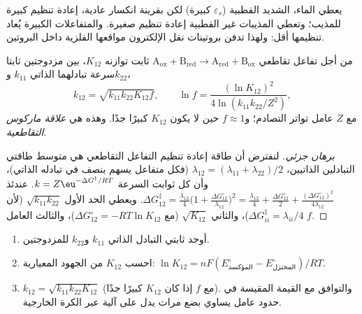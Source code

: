\admitted

يعطي الماء، الشديد القطبية ($\varepsilon_s$ كبيرة) لكن بقرينة انكسار عادية، إعادة
تنظيم كبيرة للمذيب؛ وتعطي المذيبات غير القطبية إعادة تنظيم صغيرة. والمتفاعلات الكبيرة
يُعاد تنظيمها أقل: ولهذا تدفن بروتينات نقل الإلكترون مواقعها الفلزية
داخل البروتين.

\begin{theorem}\label{thm:b3:complex-mechanisms:cross-relation}
من أجل تفاعل تقاطعي $\mathrm{A_{ox} + B_{red} \to A_{red} + B_{ox}}$ ثابت توازنه $K_{12}$، بين مزدوجتين
ثابتا سرعة تبادلهما الذاتي $k_{11}$ و$k_{22}$،
\[
  k_{12} = \sqrt{k_{11}k_{22}K_{12}f}, \qquad \ln f = \frac{(\ln K_{12})^2}{4\ln(k_{11}k_{22}/Z^2)},
\]
مع $Z$ عامل تواتر التصادم؛ و$f \approx 1$ حين لا يكون $K_{12}$ كبيرًا جدًا. وهذه هي
\emph{علاقة ماركوس التقاطعية}.
\end{theorem}

\begin{proof}[برهان جزئي]
لنفترض أن طاقة إعادة تنظيم التفاعل التقاطعي هي متوسط طاقتي
التبادلين الذاتيين، $\lambda_{12} = (\lambda_{11} + \lambda_{22})/2$ (فكل متفاعل يسهم بنصف  في
تبادله الذاتي)، وأن كل ثوابت السرعة $k = Z\eu^{-\Delta G^{\ddagger}/RT}$. عندئذ
$\Delta G_{12}^{\ddagger} = \frac{\lambda_{12}}{4}\bigl(1 + \frac{\Delta G^\circ_{12}}{\lambda_{12}}\bigr)^2 = \frac{\lambda_{12}}{4} + \frac{\Delta G^\circ_{12}}{2} + \frac{(\Delta G^\circ_{12})^2}{4\lambda_{12}}$. ويعطي الحد الأول
$\sqrt{k_{11}k_{22}}$ (لأن $\Delta G^{\ddagger}_{ii} = \lambda_{ii}/4$)، والثاني $\sqrt{K_{12}}$ (مع $\Delta G^\circ_{12} = -RT\ln K_{12}$)، والثالث
العامل $f$.
\end{proof}

\begin{method}\label{met:b3:complex-mechanisms:marcus-estimate}
\begin{enumerate}
  \item أوجد ثابتي التبادل الذاتي $k_{11}$ و$k_{22}$ للمزدوجتين.
  \item احسب $K_{12}$ من الجهود المعيارية: $\ln K_{12} = nF(E^\circ_{\text{المؤكسد}} - E^\circ_{\text{المختزل}})/RT$.
  \item $k_{12} = \sqrt{k_{11}k_{22}K_{12}}$ (مع $f$ إذا كان $K_{12}$ كبيرًا جدًا). والتوافق مع القيمة المقيسة في حدود عامل
        يساوي بضع مرات يدل على آلية عبر الكرة الخارجية.
\end{enumerate}
\end{method}

